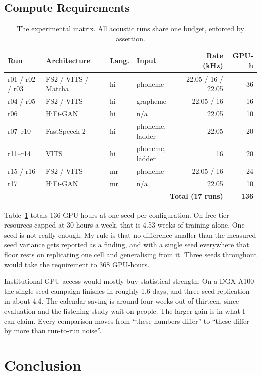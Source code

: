 \documentclass[12pt,a4paper]{article}
\begin{document}
\subsection{Compute Requirements}

\begin{table}[htbp]
\centering\small
\caption{The experimental matrix. All acoustic runs share one budget, enforced
by assertion.}
\label{tab:runs}
\begin{tabular}{llllrr}
\toprule
Run & Architecture & Lang. & Input & Rate (kHz) & GPU-h \\
\midrule
r01 / r02 / r03 & FS2 / VITS / Matcha & hi & phoneme & 22.05 / 16 / 22.05 & 36 \\
r04 / r05 & FS2 / VITS & hi & grapheme & 22.05 / 16 & 16 \\
r06 & HiFi-GAN & hi & n/a & 22.05 & 10 \\
r07--r10 & FastSpeech 2 & hi & phoneme, ladder & 22.05 & 20 \\
r11--r14 & VITS & hi & phoneme, ladder & 16 & 20 \\
r15 / r16 & FS2 / VITS & mr & phoneme & 22.05 / 16 & 24 \\
r17 & HiFi-GAN & mr & n/a & 22.05 & 10 \\
\midrule
\multicolumn{5}{r}{\textbf{Total (17 runs)}} & \textbf{136} \\
\bottomrule
\end{tabular}
\end{table}

Table~\ref{tab:runs} totals 136 GPU-hours at one seed per configuration. On
free-tier resources capped at 30 hours a week, that is 4.53 weeks of training
alone. One seed is not really enough. My rule is that no difference smaller
than the measured seed variance gets reported as a finding, and with a single
seed everywhere that floor rests on replicating one cell and generalising from
it. Three seeds throughout would take the requirement to 368 GPU-hours.

Institutional GPU access would mostly buy statistical strength. On a DGX A100
the single-seed campaign finishes in roughly 1.6 days, and three-seed
replication in about 4.4. The calendar saving is around four weeks out of
thirteen, since evaluation and the listening study wait on people. The larger
gain is in what I can claim. Every comparison moves from ``these numbers
differ'' to ``these differ by more than run-to-run noise''.

\section{Conclusion}
\end{document}
